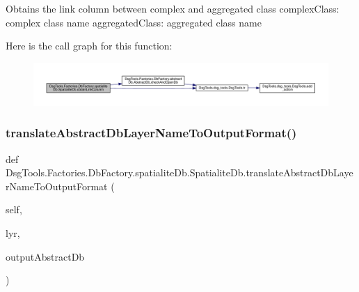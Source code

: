 \begin{DoxyVerb}Obtains the link column between complex and aggregated class
complexClass: complex class name
aggregatedClass: aggregated class name
\end{DoxyVerb}
 Here is the call graph for this function\+:
\nopagebreak
\begin{figure}[H]
\begin{center}
\leavevmode
\includegraphics[width=350pt]{class_dsg_tools_1_1_factories_1_1_db_factory_1_1spatialite_db_1_1_spatialite_db_a2f32ac600aa67edab921aa6c4de83c40_cgraph}
\end{center}
\end{figure}
\mbox{\label{class_dsg_tools_1_1_factories_1_1_db_factory_1_1spatialite_db_1_1_spatialite_db_a573a18e4e871fa495d1c2ccff47bdfc3}} 
\subsubsection{\texorpdfstring{translate\+Abstract\+Db\+Layer\+Name\+To\+Output\+Format()}{translateAbstractDbLayerNameToOutputFormat()}}
{\footnotesize\ttfamily def Dsg\+Tools.\+Factories.\+Db\+Factory.\+spatialite\+Db.\+Spatialite\+Db.\+translate\+Abstract\+Db\+Layer\+Name\+To\+Output\+Format (\begin{DoxyParamCaption}\item[{}]{self,  }\item[{}]{lyr,  }\item[{}]{output\+Abstract\+Db }\end{DoxyParamCaption})}

